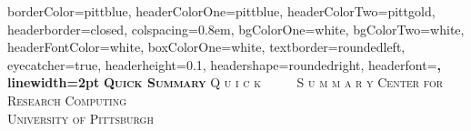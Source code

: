 \documentclass[landscape,a0paper,fontscale=0.285]{baposter} %
\begin{document}
\begin{poster}
{
borderColor=pittblue, headerColorOne=pittblue, headerColorTwo=pittgold, headerborder=closed, colspacing=0.8em, bgColorOne=white, bgColorTwo=white, headerFontColor=white, boxColorOne=white, textborder=roundedleft, eyecatcher=true, headerheight=0.1\textheight, headershape=roundedright, headerfont=\Large\bf\textsc, linewidth=2pt 
}
{\bf\textsc{Quick Summary}\vspace{0.5em}} %
{\textsc{Q u i c k \ \ \ \ \ S u m m a r y \hspace{12pt}}}
{\textsc{Center for Research Computing \\ University of Pittsburgh \hspace{12pt}}} 


\end{poster}
\end{document}
